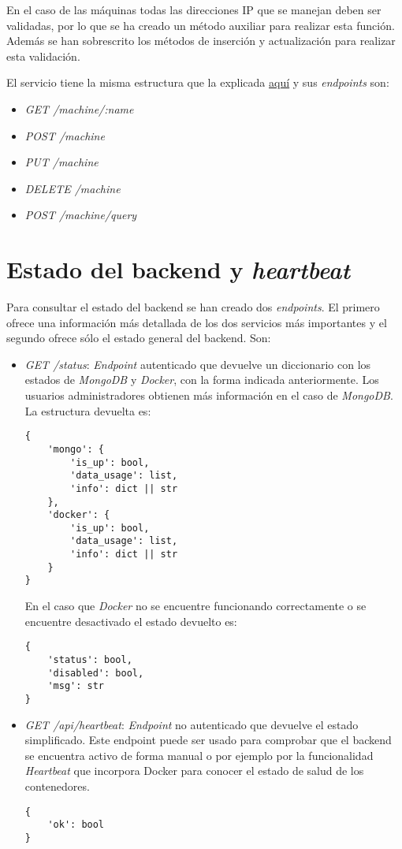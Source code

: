 \bigskip
En el caso de las máquinas todas las direcciones IP que se manejan deben ser validadas, por lo que se ha creado un método auxiliar para realizar esta función. Además se han sobrescrito los métodos de inserción y actualización para realizar esta validación.

\bigskip
El servicio tiene la misma estructura que la explicada \hyperref[sec:servicios]{aquí} y sus \textit{endpoints} son:
\begin{itemize}
	\item \textit{GET /machine/:name}
	\item \textit{POST /machine}
	\item \textit{PUT /machine}
	\item \textit{DELETE /machine}
	\item \textit{POST /machine/query}
\end{itemize}



\section{Estado del backend y \textit{heartbeat}}


Para consultar el estado del backend se han creado dos \textit{endpoints}. El primero ofrece una información más detallada de los dos servicios más importantes y el segundo ofrece sólo el estado general del backend. Son:
\begin{itemize}
	\item \textit{GET /status}: \textit{Endpoint} autenticado que devuelve un diccionario con los estados de \textit{MongoDB} y \textit{Docker}, con la forma indicada anteriormente. Los usuarios administradores obtienen más información en el caso de \textit{MongoDB}. La estructura devuelta es:

\begin{lstlisting}
{
	'mongo': {
		'is_up': bool,
		'data_usage': list,
		'info': dict || str
	},
	'docker': {
		'is_up': bool,
		'data_usage': list,
		'info': dict || str
	}
}
\end{lstlisting}

\bigskip	
En el caso que \textit{Docker} no se encuentre funcionando correctamente o se encuentre desactivado el estado devuelto es:
	
\begin{lstlisting}
{
	'status': bool,
	'disabled': bool,
	'msg': str
}
\end{lstlisting}
	
	\item \textit{GET /api/heartbeat}: \textit{Endpoint} no autenticado que devuelve el estado simplificado. Este endpoint puede ser usado para comprobar que el backend se encuentra activo de forma manual o por ejemplo por la funcionalidad \textit{Heartbeat} que incorpora Docker para conocer el estado de salud de los contenedores.
	
\begin{lstlisting}
{
	'ok': bool
}
\end{lstlisting}
\end{itemize}



